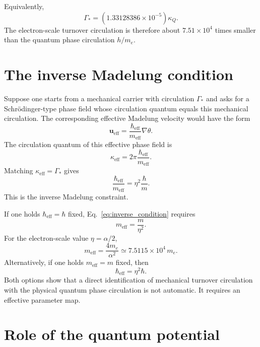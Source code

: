 \documentclass[11pt,a4paper]{article}
\newcommand{\kappaQ}{\kappa_{Q}}
\newcommand{\GammaStar}{\Gamma_{*}}
\newcommand{\hbareff}{\hbar_{\mathrm{eff}}}
\newcommand{\meff}{m_{\mathrm{eff}}}
\begin{document}
Equivalently,
\begin{equation}
    \GammaStar
    =
    \left(1.33128386\times10^{-5}\right)\kappaQ.
\end{equation}
The electron-scale turnover circulation is therefore about $7.51\times10^4$ times smaller than the quantum phase circulation $h/m_e$.

\section{The inverse Madelung condition}

Suppose one starts from a mechanical carrier with circulation $\GammaStar$ and asks for a Schr\"odinger-type phase field whose circulation quantum equals this mechanical circulation. The corresponding effective Madelung velocity would have the form
\begin{equation}
    \mathbf{u}_{\mathrm{eff}}
    =
    \frac{\hbareff}{\meff}\nabla\theta.
\end{equation}
The circulation quantum of this effective phase field is
\begin{equation}
    \kappa_{\mathrm{eff}}
    =
    2\pi\frac{\hbareff}{\meff}.
\end{equation}
Matching $\kappa_{\mathrm{eff}}=\GammaStar$ gives
\begin{equation}
    \boxed{
    \frac{\hbareff}{\meff}
    =
    \eta^2\frac{\hbar}{m}.
    }
    \label{eq:inverse_condition}
\end{equation}
This is the inverse Madelung constraint.

If one holds $\hbareff=\hbar$ fixed, Eq.~\eqref{eq:inverse_condition} requires
\begin{equation}
    \meff=\frac{m}{\eta^2}.
    \label{eq:meff_condition}
\end{equation}
For the electron-scale value $\eta=\alpha/2$,
\begin{equation}
    \meff
    =
    \frac{4m_e}{\alpha^2}
    \simeq
    7.5115\times10^4\,m_e.
    \label{eq:meff_electron}
\end{equation}
Alternatively, if one holds $\meff=m$ fixed, then
\begin{equation}
    \hbareff=\eta^2\hbar.
\end{equation}
Both options show that a direct identification of mechanical turnover circulation with the physical quantum phase circulation is not automatic. It requires an effective parameter map.

\section{Role of the quantum potential}
\end{document}
